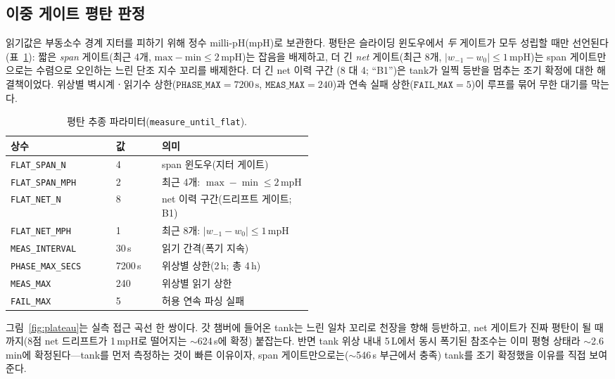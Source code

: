 \documentclass[11pt]{article}
\begin{document}
\subsection{이중 게이트 평탄 판정}
읽기값은 부동소수 경계 지터를 피하기 위해 정수 milli-pH(mpH)로 보관한다. 평탄은
슬라이딩 윈도우에서 \emph{두} 게이트가 모두 성립할 때만 선언된다(표~\ref{tab:plateau}):
짧은 \emph{span} 게이트(최근 4개, $\mathrm{max}-\mathrm{min}\le 2$\,mpH)는 잡음을
배제하고, 더 긴 \emph{net} 게이트(최근 8개, $|w_{-1}-w_{0}|\le 1$\,mpH)는 span
게이트만으로는 수렴으로 오인하는 느린 단조 지수 꼬리를 배제한다. 더 긴 net 이력 구간
(8 대 4; ``B1'')은 tank가 일찍 등반을 멈추는 조기 확정에 대한 해결책이었다. 위상별
벽시계ㆍ읽기수 상한($\mathtt{PHASE\_MAX}=7200\,\mathrm{s}$, $\mathtt{MEAS\_MAX}=240$)과
연속 실패 상한($\mathtt{FAIL\_MAX}=5$)이 루프를 묶어 무한 대기를 막는다.

\begin{table}[t]
\centering
\caption{평탄 추종 파라미터(\texttt{measure\_until\_flat}).}
\label{tab:plateau}
\footnotesize
\begin{tabular}{@{}llp{0.5\linewidth}@{}}
\toprule
상수 & 값 & 의미 \\
\midrule
\texttt{FLAT\_SPAN\_N}  & 4 & span 윈도우(지터 게이트) \\
\texttt{FLAT\_SPAN\_MPH}& 2 & 최근 4개: $\max-\min\le 2$\,mpH \\
\texttt{FLAT\_NET\_N}   & 8 & net 이력 구간(드리프트 게이트; B1) \\
\texttt{FLAT\_NET\_MPH} & 1 & 최근 8개: $|w_{-1}-w_0|\le 1$\,mpH \\
\texttt{MEAS\_INTERVAL} & 30\,s & 읽기 간격(폭기 지속) \\
\texttt{PHASE\_MAX\_SECS}& 7200\,s & 위상별 상한(2\,h; 총 4\,h) \\
\texttt{MEAS\_MAX}      & 240 & 위상별 읽기 상한 \\
\texttt{FAIL\_MAX}      & 5 & 허용 연속 파싱 실패 \\
\bottomrule
\end{tabular}
\end{table}

그림~\ref{fig:plateau}는 실측 접근 곡선 한 쌍이다. 갓 챔버에 들어온 tank는 느린
일차 꼬리로 천장을 향해 등반하고, net 게이트가 진짜 평탄이 될 때까지(8점 net
드리프트가 1\,mpH로 떨어지는 $\sim$624\,s에 확정) 붙잡는다. 반면 tank 위상 내내
5\,L에서 동시 폭기된 참조수는 이미 평형 상태라 $\sim$2.6\,min에 확정된다---tank를
먼저 측정하는 것이 빠른 이유이자, span 게이트만으로는($\sim$546\,s 부근에서 충족)
tank를 조기 확정했을 이유를 직접 보여 준다.
\end{document}
